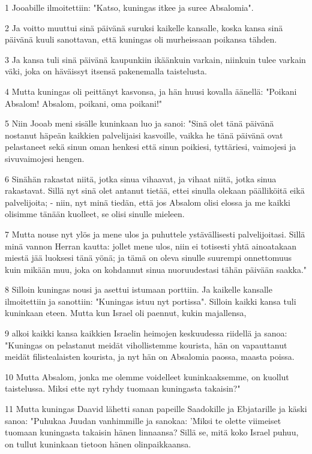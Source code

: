 \par 1 Jooabille ilmoitettiin: "Katso, kuningas itkee ja suree Absalomia".
\par 2 Ja voitto muuttui sinä päivänä suruksi kaikelle kansalle, koska kansa sinä päivänä kuuli sanottavan, että kuningas oli murheissaan poikansa tähden.
\par 3 Ja kansa tuli sinä päivänä kaupunkiin ikäänkuin varkain, niinkuin tulee varkain väki, joka on häväissyt itsensä pakenemalla taistelusta.
\par 4 Mutta kuningas oli peittänyt kasvonsa, ja hän huusi kovalla äänellä: "Poikani Absalom! Absalom, poikani, oma poikani!"
\par 5 Niin Jooab meni sisälle kuninkaan luo ja sanoi: "Sinä olet tänä päivänä nostanut häpeän kaikkien palvelijaisi kasvoille, vaikka he tänä päivänä ovat pelastaneet sekä sinun oman henkesi että sinun poikiesi, tyttäriesi, vaimojesi ja sivuvaimojesi hengen.
\par 6 Sinähän rakastat niitä, jotka sinua vihaavat, ja vihaat niitä, jotka sinua rakastavat. Sillä nyt sinä olet antanut tietää, ettei sinulla olekaan päälliköitä eikä palvelijoita; - niin, nyt minä tiedän, että jos Absalom olisi elossa ja me kaikki olisimme tänään kuolleet, se olisi sinulle mieleen.
\par 7 Mutta nouse nyt ylös ja mene ulos ja puhuttele ystävällisesti palvelijoitasi. Sillä minä vannon Herran kautta: jollet mene ulos, niin ei totisesti yhtä ainoatakaan miestä jää luoksesi tänä yönä; ja tämä on oleva sinulle suurempi onnettomuus kuin mikään muu, joka on kohdannut sinua nuoruudestasi tähän päivään saakka."
\par 8 Silloin kuningas nousi ja asettui istumaan porttiin. Ja kaikelle kansalle ilmoitettiin ja sanottiin: "Kuningas istuu nyt portissa". Silloin kaikki kansa tuli kuninkaan eteen. Mutta kun Israel oli paennut, kukin majallensa,
\par 9 alkoi kaikki kansa kaikkien Israelin heimojen keskuudessa riidellä ja sanoa: "Kuningas on pelastanut meidät vihollistemme kourista, hän on vapauttanut meidät filistealaisten kourista, ja nyt hän on Absalomia paossa, maasta poissa.
\par 10 Mutta Absalom, jonka me olemme voidelleet kuninkaaksemme, on kuollut taistelussa. Miksi ette nyt ryhdy tuomaan kuningasta takaisin?"
\par 11 Mutta kuningas Daavid lähetti sanan papeille Saadokille ja Ebjatarille ja käski sanoa: "Puhukaa Juudan vanhimmille ja sanokaa: 'Miksi te olette viimeiset tuomaan kuningasta takaisin hänen linnaansa? Sillä se, mitä koko Israel puhuu, on tullut kuninkaan tietoon hänen olinpaikkaansa.
